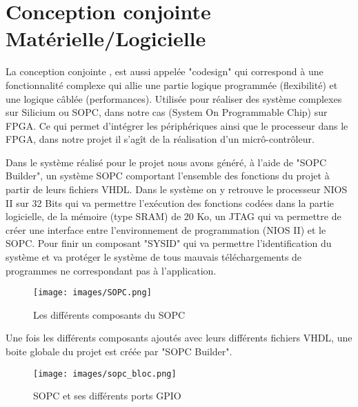 \section{Conception conjointe Matérielle/Logicielle}
La conception conjointe , est aussi appelée "codesign" qui correspond à une fonctionnalité complexe qui allie une partie logique programmée (flexibilité) et une logique câblée (performances). Utilisée pour réaliser des système complexes sur Silicium ou SOPC, dans notre cas (System On Programmable Chip) sur FPGA. Ce qui permet d'intégrer les périphériques ainsi que le processeur dans le FPGA, dans notre projet il s'agît de la réalisation d'un micrô-contrôleur.\newline

Dans le système réalisé pour le projet nous avons généré, à l'aide de "SOPC Builder", un système SOPC comportant l'ensemble des fonctions du projet à partir de leurs fichiers VHDL. Dans le système on y retrouve le processeur NIOS II sur 32 Bits qui va permettre l'exécution des fonctions codées dans la partie logicielle, de la mémoire (type SRAM) de 20 Ko, un JTAG qui va permettre de créer une interface entre l'environnement de programmation (NIOS II) et le SOPC. Pour finir un composant "SYSID" qui va permettre l'identification du système et va protéger le système de tous mauvais téléchargements de programmes ne correspondant pas à l'application.\vspace{0.5cm}
\begin{figure}[h]
    \begin{center}
      \texttt{[image: images/SOPC.png]}
      \caption{Les différents composants du SOPC}
    \end{center}
  \end{figure}

  \newpage 

  Une fois les différents composants ajoutés avec leurs différents fichiers VHDL, une boite globale du projet est créée par "SOPC Builder".

  \begin{figure}[h]
    \begin{center}
      \texttt{[image: images/sopc\_bloc.png]}
      \caption{SOPC et ses différents ports GPIO}
    \end{center}
  \end{figure}
